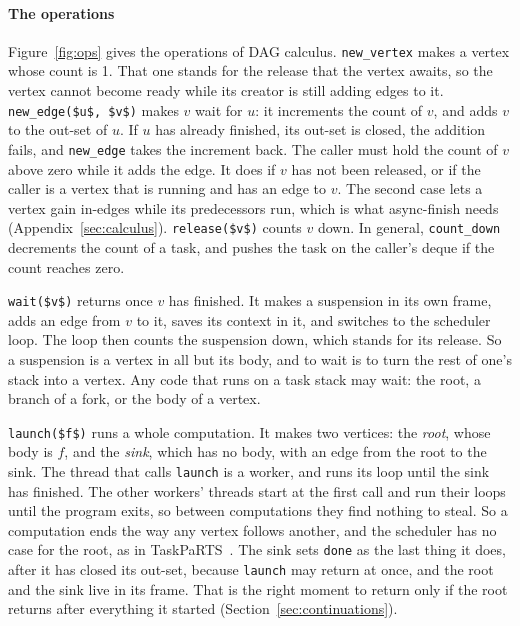 \documentclass[sigplan,nonacm]{acmart}
\begin{document}
\paragraph{The operations}
%
Figure~\ref{fig:ops} gives the operations of DAG calculus.
%
\lstinline|new_vertex| makes a vertex whose count is 1.
%
That one stands for the release that the vertex awaits, so the vertex
cannot become ready while its creator is still adding edges to it.
%
\lstinline|new_edge($u$, $v$)| makes $v$ wait for $u$: it increments
the count of $v$, and adds $v$ to the out-set of $u$.
%
If $u$ has already finished, its out-set is closed, the addition
fails, and \lstinline|new_edge| takes the increment back.
%
The caller must hold the count of $v$ above zero while it adds the
edge.
%
It does if $v$ has not been released, or if the caller is a vertex
that is running and has an edge to $v$.
%
The second case lets a vertex gain in-edges while its predecessors
run, which is what async-finish needs
(Appendix~\ref{sec:calculus}).
%
\lstinline|release($v$)| counts $v$ down.
%
In general, \lstinline|count_down| decrements the count of a task, and
pushes the task on the caller's deque if the count reaches zero.

\lstinline|wait($v$)| returns once $v$ has finished.
%
It makes a suspension in its own frame, adds an edge from $v$ to it,
saves its context in it, and switches to the scheduler loop.
%
The loop then counts the suspension down, which stands for its
release.
%
So a suspension is a vertex in all but its body, and to wait is to
turn the rest of one's stack into a vertex.
%
Any code that runs on a task stack may wait: the root, a branch of a
fork, or the body of a vertex.

\lstinline|launch($f$)| runs a whole computation.
%
It makes two vertices: the \emph{root}, whose body is $f$, and the
\emph{sink}, which has no body, with an edge from the root to the
sink.
%
The thread that calls \lstinline|launch| is a worker, and runs its
loop until the sink has finished.
%
The other workers' threads start at the first call and run their
loops until the program exits, so between computations they find
nothing to steal.
%
So a computation ends the way any vertex follows another, and the
scheduler has no case for the root, as in
TaskPaRTS~\cite{taskparts}.
%
The sink sets \lstinline|done| as the last thing it does, after it
has closed its out-set, because \lstinline|launch| may return at
once, and the root and the sink live in its frame.
%
That is the right moment to return only if the root returns after
everything it started (Section~\ref{sec:continuations}).
\end{document}
